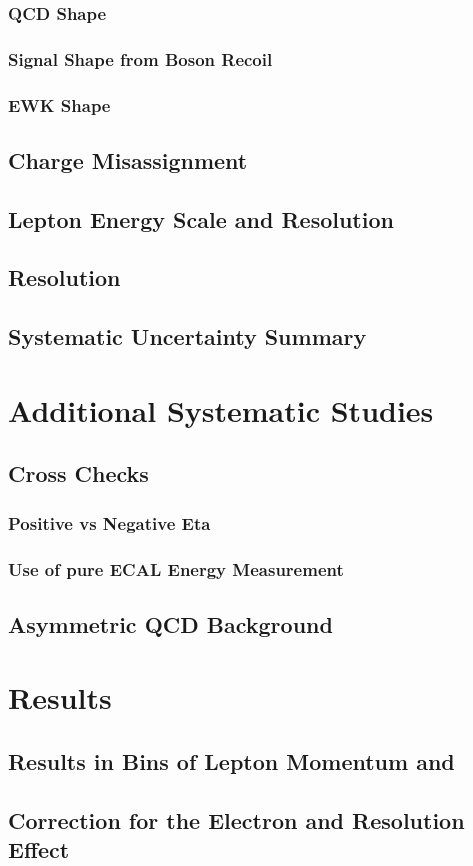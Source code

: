 \subsubsection{QCD \ETm Shape}
\subsubsection{Signal \ETm Shape from Boson Recoil}
\subsubsection{EWK \ETm Shape}
\subsection{Charge Misassignment}
\subsection{Lepton Energy Scale and Resolution}
\subsection{\ETm Resolution}
\subsection{Systematic Uncertainty Summary}

\section{Additional Systematic Studies}
\subsection{Cross Checks}
\subsubsection{Positive vs Negative Eta}
\subsubsection{Use of pure ECAL Energy Measurement}
\subsection{Asymmetric QCD Background}

\section{Results}
\subsection{Results in Bins of Lepton Momentum and \ETm}
\subsection{Correction for the Electron and \ETm Resolution Effect}


